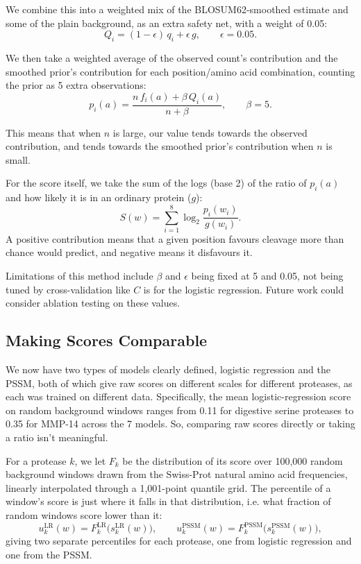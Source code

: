 \documentclass[10pt,a4paper]{article}
\numberwithin{equation}{section}
\begin{document}
We combine this into a weighted mix of the BLOSUM62-smoothed estimate and some of the plain background, as an extra safety net, with a weight of 0.05:
\begin{equation}
Q_i = (1-\epsilon)\,q_i + \epsilon\, g, \qquad \epsilon = 0.05.
\label{eq:mix}
\end{equation}

We then take a weighted average of the observed count's contribution and the smoothed prior's contribution for each position/amino acid combination, counting the prior as 5 extra observations:
\begin{equation}
p_i(a) = \frac{n\,f_i(a) + \beta\, Q_i(a)}{n+\beta}, \qquad \beta = 5.
\label{eq:pia}
\end{equation}

This means that when $n$ is large, our value tends towards the observed contribution, and tends towards the smoothed prior's contribution when $n$ is small.

For the score itself, we take the sum of the logs (base 2) of the ratio of $p_i(a)$ and how likely it is in an ordinary protein ($g$):
\begin{equation}
S(w) = \sum_{i=1}^{8} \log_2 \frac{p_i(w_i)}{g(w_i)}.
\label{eq:pssm_score}
\end{equation}
A positive contribution means that a given position favours cleavage more than chance would predict, and negative means it disfavours it.

Limitations of this method include $\beta$ and $\epsilon$ being fixed at 5 and 0.05, not being tuned by cross-validation like $C$ is for the logistic regression. Future work could consider ablation testing on these values.

\subsection{Making Scores Comparable}

We now have two types of models clearly defined, logistic regression and the PSSM, both of which give raw scores on different scales for different proteases, as each was trained on different data. Specifically, the mean logistic-regression score on random background windows ranges from 0.11 for digestive serine proteases to 0.35 for MMP-14 across the 7 models. So, comparing raw scores directly or taking a ratio isn't meaningful.

For a protease $k$, we let $F_k$ be the distribution of its score over 100,000 random background windows drawn from the Swiss-Prot natural amino acid frequencies, linearly interpolated through a 1,001-point quantile grid. The percentile of a window's score is just where it falls in that distribution, i.e. what fraction of random windows score lower than it:
\begin{equation}
u_k^{\mathrm{LR}}(w) = F_k^{\mathrm{LR}}\bigl(s_k^{\mathrm{LR}}(w)\bigr), \qquad u_k^{\mathrm{PSSM}}(w) = F_k^{\mathrm{PSSM}}\bigl(s_k^{\mathrm{PSSM}}(w)\bigr),
\label{eq:pct}
\end{equation}
giving two separate percentiles for each protease, one from logistic regression and one from the PSSM.
\end{document}
